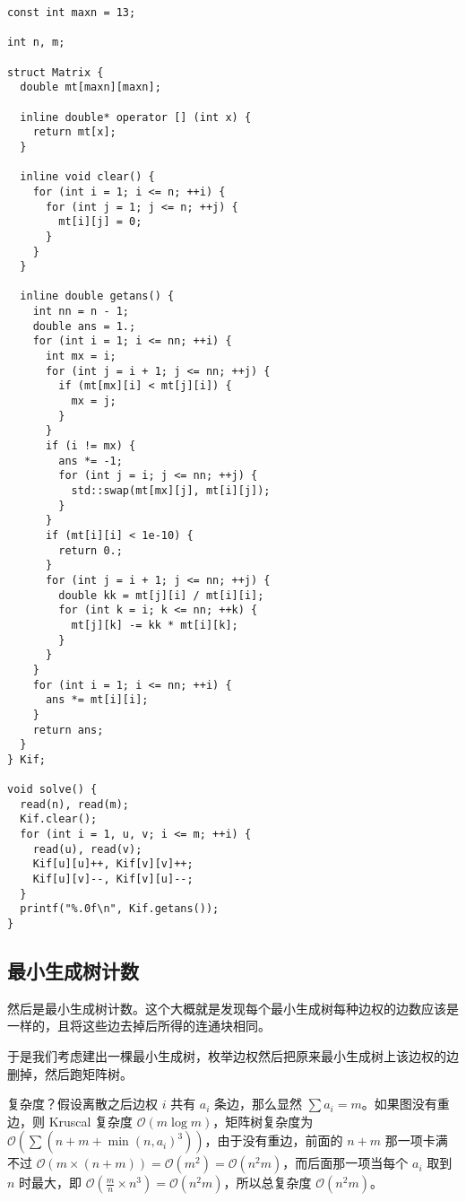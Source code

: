 \documentclass[a4paper,11pt,twoside,fontset = fandol,UTF8]{ctexbook} %
\begin{document}
\begin{lstlisting}
const int maxn = 13;

int n, m;

struct Matrix {
  double mt[maxn][maxn];

  inline double* operator [] (int x) {
    return mt[x];
  }

  inline void clear() {
    for (int i = 1; i <= n; ++i) {
      for (int j = 1; j <= n; ++j) {
        mt[i][j] = 0;
      }
    }
  }

  inline double getans() {
    int nn = n - 1;
    double ans = 1.;
    for (int i = 1; i <= nn; ++i) {
      int mx = i;
      for (int j = i + 1; j <= nn; ++j) {
        if (mt[mx][i] < mt[j][i]) {
          mx = j;
        }
      }
      if (i != mx) {
        ans *= -1;
        for (int j = i; j <= nn; ++j) {
          std::swap(mt[mx][j], mt[i][j]);
        }
      }
      if (mt[i][i] < 1e-10) {
        return 0.;
      }
      for (int j = i + 1; j <= nn; ++j) {
        double kk = mt[j][i] / mt[i][i];
        for (int k = i; k <= nn; ++k) {
          mt[j][k] -= kk * mt[i][k];
        }
      }
    }
    for (int i = 1; i <= nn; ++i) {
      ans *= mt[i][i];
    }
    return ans;
  }
} Kif;

void solve() {
  read(n), read(m);
  Kif.clear();
  for (int i = 1, u, v; i <= m; ++i) {
    read(u), read(v);
    Kif[u][u]++, Kif[v][v]++;
    Kif[u][v]--, Kif[v][u]--;
  }
  printf("%.0f\n", Kif.getans());
}
\end{lstlisting}

\subsection{最小生成树计数}

然后是最小生成树计数。这个大概就是发现每个最小生成树每种边权的边数应该是一样的，且将这些边去掉后所得的连通块相同。

于是我们考虑建出一棵最小生成树，枚举边权然后把原来最小生成树上该边权的边删掉，然后跑矩阵树。

复杂度？假设离散之后边权 $i$ 共有 $a_i$ 条边，那么显然 $\sum a_i=m$。如果图没有重边，则 Kruscal 复杂度 $\mathcal{O}(m\log m)$，矩阵树复杂度为 $\mathcal{O}\left(\sum \left(n+m+\min(n, a_i)^3\right)\right)$，由于没有重边，前面的 $n+m$ 那一项卡满不过 $\mathcal{O}(m\times (n+m))=\mathcal{O}(m^2)=\mathcal{O}(n^2m)$，而后面那一项当每个 $a_i$ 取到 $n$ 时最大，即 $\mathcal{O}\left(\frac{m}{n}\times n^3\right)=\mathcal{O}(n^2m)$，所以总复杂度 $\mathcal{O}(n^2m)$。
\end{document}
